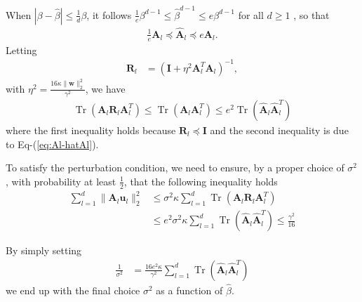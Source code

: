 \documentclass[journal]{IEEEtran} %
\def\eqref#1{Eq-(\ref{#1})}
\def\vu{{\bm{u}}}
\def\vw{{\bm{w}}}
\def\mA{{\bm{A}}}
\def\mI{{\bm{I}}}
\def\mR{{\bm{R}}}
\newcommand{\Norm}[1]{\|#1\|}
\newcommand{\Abs}[1]{|#1|}
\DeclareMathOperator{\Tr}{Tr}
\begin{document}
When $\Abs{\beta-\hat{\beta}} \le \frac{1}{d}\beta$, it follows $\frac{1}{e} \beta^{d-1} \le \hat{\beta}^{d-1} \le e\beta^{d-1}$ for all $d \ge 1$ \cite{neyshabur2018pac}, so that
\begin{align} \label{eq:Al-hatAl}
   \frac{1}{e} \mA_l \preceq \hat{\mA}_l \preceq e \mA_l.
\end{align}
Letting
\begin{align}
     \mR_l &= (\mI + \eta^2 {\mA}_l^T {\mA}_l)^{-1}, 
\end{align}
with $\eta^2=\frac{16   \kappa \Norm{\vw}_2^2}{\gamma^2}$, we have
\begin{align}
    \Tr({\mA}_l {\mR}_l {\mA}_l^T) \le \Tr({\mA}_l {\mA}_l^T) \le e^2\Tr(\hat{\mA}_l \hat{\mA}_l^T)
\end{align}
where the first inequality holds because $\mR_l \preceq \mI$ and the second inequality is due to \eqref{eq:Al-hatAl}.


To satisfy the perturbation condition, we need to ensure, by a proper choice of $\sigma^2$, with probability at least $\frac{1}{2}$, that the following inequality holds
\begin{align}
   \sum_{l=1}^d \Norm{{\mA}_l \vu_l}_2^2 &\le \sigma^2 \kappa \sum_{l=1}^d \Tr({\mA}_l {\mR}_l {\mA}_l^T)\\
   &\le e^2 \sigma^2 \kappa \sum_{l=1}^d \Tr(\hat{\mA}_l \hat{\mA}_l^T)
   \le  \frac{\gamma^2}{16}
\end{align}
 
By simply setting
\begin{align} \label{eq:choice-sigma-diag}
    \frac{1}{{\sigma}^2} &= \frac{16e^2 \kappa}{\gamma^2} \sum_{l=1}^d \Tr(\hat{\mA}_l  \hat{\mA}_l^T)
\end{align}
we end up with the final choice ${\sigma}^2$ as a function of $\hat{\beta}$.
\end{document}
